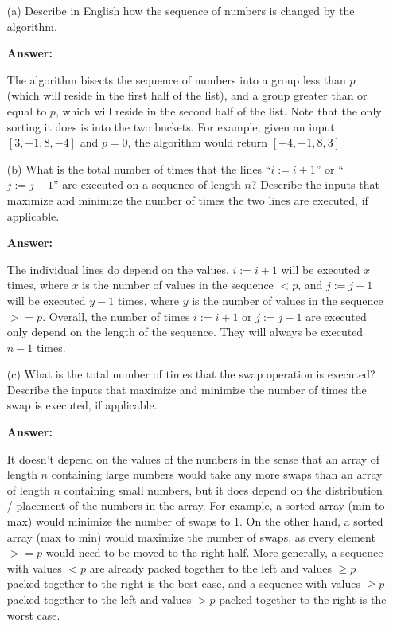 \documentclass[14pt]{extreport}
\newcommand{\answer}[0]{\medskip \textbf{Answer:} \medskip}
\begin{document}
\begin{enumerate}
    
    \item[(a)] Describe in English how the sequence of numbers is changed by the algorithm.
    
        \answer

        The algorithm bisects the sequence of numbers into a group less than \( p \) (which will reside in the first half of the list), and a group greater than or equal to \( p \), which will reside in the second half of the list. Note that the only sorting it does is into the two buckets. For example, given an input \( [3, -1, 8, -4] \) and \( p = 0 \), the algorithm would return \( [-4, -1, 8, 3] \)

    \item[(b)] What is the total number of times that the lines ``\( i := i + 1 \)'' or ``\( j := j - 1 \)'' are executed on a sequence of length \( n \)? Describe the inputs that maximize and minimize the number of times the two lines are executed, if applicable.
    
        \answer

        The individual lines do depend on the values. \( i := i + 1 \) will be executed \( x \) times, where \( x \) is the number of values in the sequence \( < p \), and \( j := j - 1 \) will be executed \( y - 1 \) times, where \( y \) is the number of values in the sequence \( >= p \). Overall, the number of times \( i := i + 1 \) or \( j := j - 1 \) are executed only depend on the length of the sequence. They will always be executed \( n - 1 \) times.

    \item[(c)] What is the total number of times that the swap operation is executed? Describe the inputs that maximize and minimize the number of times the swap is executed, if applicable.

        \answer

        It doesn't depend on the values of the numbers in the sense that an array of length \( n \) containing large numbers would take any more swaps than an array of length \( n \) containing small numbers, but it does depend on the distribution / placement of the numbers in the array. For example, a sorted array (min to max) would minimize the number of swaps to 1. On the other hand, a sorted array (max to min) would maximize the number of swaps, as every element \( >= p \) would need to be moved to the right half. More generally, a sequence with values \( < p \) are already packed together to the left and values \( \geq p \) packed together to the right is the best case, and a sequence with values \( \geq p \) packed together to the left and values \( > p \) packed together to the right is the worst case.


\end{enumerate}
\end{document}
